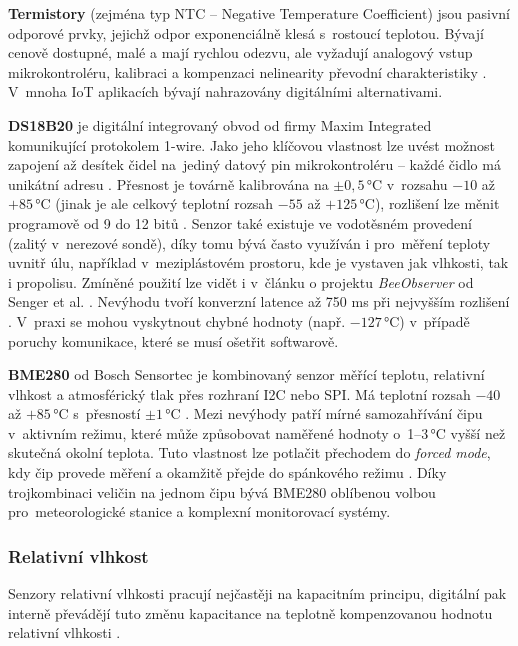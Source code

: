 \textbf{Termistory} (zejména typ NTC -- Negative Temperature Coefficient) jsou pasivní odporové prvky, jejichž odpor exponenciálně klesá s~rostoucí teplotou. Bývají cenově dostupné, malé a mají rychlou odezvu, ale vyžadují analogový vstup mikrokontroléru, kalibraci a kompenzaci nelinearity převodní charakteristiky \cite{bhageria2026}. V~mnoha IoT aplikacích bývají nahrazovány digitálními alternativami.

\textbf{DS18B20} je digitální integrovaný obvod od firmy Maxim Integrated komunikující protokolem 1-wire. Jako jeho klíčovou vlastnost lze uvést možnost zapojení až desítek čidel na~jediný datový pin mikrokontroléru -- každé čidlo má unikátní adresu \cite{randomNerdTutorials}. Přesnost je továrně kalibrována na $\pm0{,}5$\,°C v~rozsahu $-10$ až $+85$\,°C (jinak je ale celkový teplotní rozsah $-55$ až $+125$\,°C), rozlišení lze měnit programově od 9 do 12 bitů \cite{bhageria2026}. Senzor také existuje ve vodotěsném provedení (zalitý v~nerezové sondě), díky tomu bývá často využíván i pro~měření teploty uvnitř úlu, například v~meziplástovém prostoru, kde je vystaven jak vlhkosti, tak i propolisu. Zmíněné použití lze vidět i v~článku o projektu \textit{BeeObserver} od Senger et al. \cite{BeeObserver}. Nevýhodu tvoří konverzní latence až 750 ms při nejvyšším rozlišení \cite{DS18B20datasheet}. V~praxi se mohou vyskytnout chybné hodnoty (např. $-127$\,°C) v~případě poruchy komunikace, které se musí ošetřit softwarově.

\textbf{BME280} od Bosch Sensortec je kombinovaný senzor měřící teplotu, relativní vlhkost a atmosférický tlak přes rozhraní I2C nebo SPI. Má teplotní rozsah $-40$ až $+85$\,°C s~přesností $\pm1$\,°C \cite{BME280datasheet}. Mezi nevýhody patří mírné samozahřívání čipu v~aktivním režimu, které může způsobovat naměřené hodnoty o~1--3\,°C vyšší než skutečná okolní teplota. Tuto vlastnost lze potlačit přechodem do \textit{forced mode}, kdy čip provede měření a okamžitě přejde do spánkového režimu \cite{randomNerdTutorials}. Díky trojkombinaci veličin na jednom čipu bývá BME280 oblíbenou volbou pro~meteorologické stanice a komplexní monitorovací systémy.

\subsubsection*{Relativní vlhkost}
Senzory relativní vlhkosti pracují nejčastěji na kapacitním principu, digitální pak interně převádějí tuto změnu kapacitance na teplotně kompenzovanou hodnotu relativní vlhkosti \cite{zbotic}.

